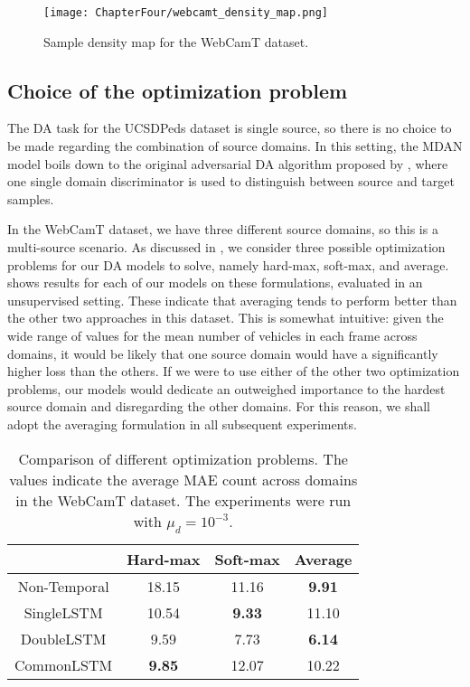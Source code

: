 \begin{figure}[!ht]
    \centering
    \texttt{[image: ChapterFour/webcamt\_density\_map.png]}
    \caption{Sample density map for the WebCamT dataset.}
    \label{fig:webcamt_density_map}
\end{figure}

\subsection{Choice of the optimization problem}

The DA task for the UCSDPeds dataset is single source, so there is no choice to be made regarding the combination of source domains. In this setting, the MDAN model boils down to the original adversarial DA algorithm proposed by \citet{Ganin2015}, where one single domain discriminator is used to distinguish between source and target samples.

In the WebCamT dataset, we have three different source domains, so this is a multi-source scenario. As discussed in , we consider three possible optimization problems for our DA models to solve, namely hard-max, soft-max, and average.  shows results for each of our models on these formulations, evaluated in an unsupervised setting. These indicate that averaging tends to perform better than the other two approaches in this dataset. This is somewhat intuitive: given the wide range of values for the mean number of vehicles in each frame across domains, it would be likely that one source domain would have a significantly higher loss than the others. If we were to use either of the other two optimization problems, our models would dedicate an outweighed importance to the hardest source domain and disregarding the other domains. For this reason, we shall adopt the averaging formulation in all subsequent experiments.

\begin{table}[!ht]
    \centering
    \begin{tabular}{ c | c  c  c }
        & Hard-max & Soft-max & Average\\
        \hline
        Non-Temporal & 18.15 & 11.16 & \textbf{9.91}  \\
        SingleLSTM & 10.54 & \textbf{9.33} & 11.10  \\
        DoubleLSTM & 9.59 & 7.73 & \textbf{6.14} \\
        CommonLSTM & \textbf{9.85} & 12.07 & 10.22 \\
    \end{tabular}
    \caption{Comparison of different optimization problems. The values indicate the average MAE count across domains in the WebCamT dataset. The experiments were run with $\mu_d=10^{-3}$. }
    \label{table:optimization_experiments}
\end{table}

